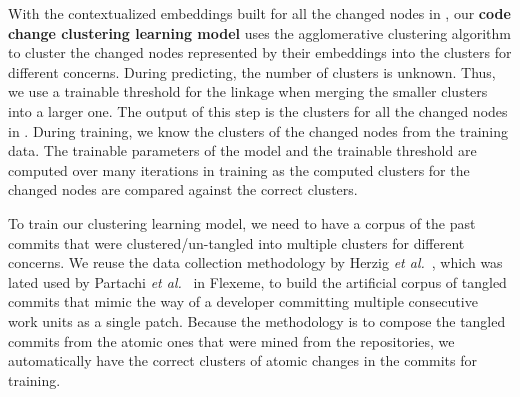 

With the contextualized embeddings built for all the changed nodes in
{\mvpdg}, our {\bf code change clustering learning model} uses the
agglomerative clustering algorithm to cluster the changed nodes
represented by their embeddings into the clusters for different
concerns. During predicting, the number of clusters is unknown. Thus,
we use a trainable threshold for the linkage when merging the smaller
clusters into a larger one. The output of this step is the clusters
for all the changed nodes in {\mvpdg}. During training, we know the
clusters of the changed nodes from the training data. The trainable
parameters of the model and the trainable threshold are computed over
many iterations in training as the computed clusters for the
changed nodes are compared against the correct clusters.

 To train our clustering
learning model, we need to have a corpus of the past commits that were
clustered/un-tangled into multiple clusters for different concerns. We
reuse the data collection methodology by Herzig {\em et
  al.}~\cite{kim-emse16}, which was lated used by Partachi {\em et
  al.}~\cite{flexeme-fse20} in Flexeme, to build the artificial corpus
of tangled commits that mimic the way of a developer committing
multiple consecutive work units as a single patch. Because the
methodology is to compose the tangled commits from the atomic ones
that were mined from the repositories, we automatically have the
correct clusters of atomic changes in the commits for training.



